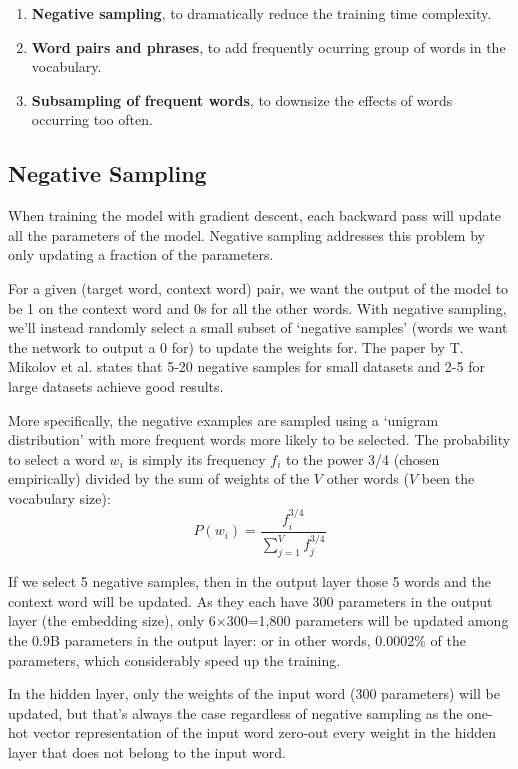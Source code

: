 \begin{enumerate}
    \item \textbf{Negative sampling}, to dramatically reduce the training time complexity.
    \item \textbf{Word pairs and phrases}, to add frequently ocurring group of words in the vocabulary.
    \item \textbf{Subsampling of frequent words}, to downsize the effects of words occurring too often.
\end{enumerate}

\subsection{Negative Sampling}
When training the model with gradient descent, each backward pass will update all the parameters of the model. Negative sampling addresses this problem by only updating a fraction of the parameters.

For a given (target word, context word) pair, we want the output of the model to be 1 on the context word and 0s for all the other words. With negative sampling, we'll instead randomly select a small subset of `negative samples' (words we want the network to output a 0 for) to update the weights for. The paper by T. Mikolov et al. \cite{word2vec2} states that 5-20 negative samples for small datasets and 2-5 for large datasets achieve good results.

More specifically, the negative examples are sampled using a `unigram distribution' with more frequent words more likely to be selected. The probability to select a word $w_i$ is simply its frequency $f_i$ to the power 3/4 (chosen empirically) divided by the sum of weights of the $V$ other words ($V$ been the vocabulary size):
\begin{equation}
    P(w_i) = \frac{f_i^{3/4}}{\sum_{j=1}^V f_j^{3/4}}
\end{equation}

If we select 5 negative samples, then in the output layer those 5 words and the context word will be updated. As they each have 300 parameters in the output layer (the embedding size), only 6$\times$300=1,800 parameters will be updated among the 0.9B parameters in the output layer: or in other words, 0.0002\% of the parameters, which considerably speed up the training.

In the hidden layer, only the weights of the input word (300 parameters) will be updated, but that's always the case regardless of negative sampling as the one-hot vector representation of the input word zero-out every weight in the hidden layer that does not belong to the input word.

